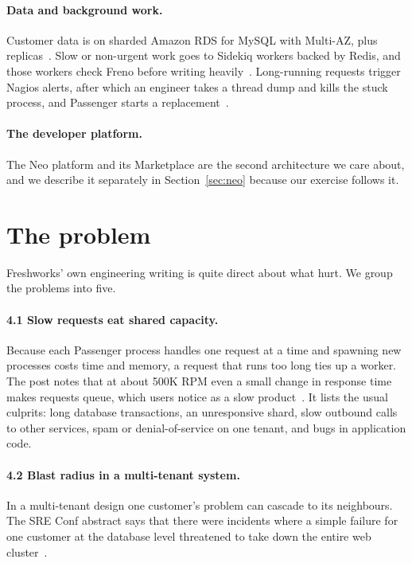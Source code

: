 \documentclass[10pt,a4paper]{article}
\begin{document}
\paragraph{Data and background work.} Customer data is on sharded Amazon RDS for MySQL with Multi-AZ, plus replicas~\cite{kumar2020}. Slow or non-urgent work goes to Sidekiq workers backed by Redis, and those workers check Freno before writing heavily~\cite{bgjobs}. Long-running requests trigger Nagios alerts, after which an engineer takes a thread dump and kills the stuck process, and Passenger starts a replacement~\cite{kumar2020}.

\paragraph{The developer platform.} The Neo platform and its Marketplace are the second architecture we care about, and we describe it separately in Section~\ref{sec:neo} because our exercise follows it.

\section{The problem}

Freshworks' own engineering writing is quite direct about what hurt. We group the problems into five.

\paragraph{4.1 Slow requests eat shared capacity.} Because each Passenger process handles one request at a time and spawning new processes costs time and memory, a request that runs too long ties up a worker. The post notes that at about 500K RPM even a small change in response time makes requests queue, which users notice as a slow product~\cite{kumar2020}. It lists the usual culprits: long database transactions, an unresponsive shard, slow outbound calls to other services, spam or denial-of-service on one tenant, and bugs in application code.

\paragraph{4.2 Blast radius in a multi-tenant system.} In a multi-tenant design one customer's problem can cascade to its neighbours. The SRE Conf abstract says that there were incidents where a simple failure for one customer at the database level threatened to take down the entire web cluster~\cite{srinivasan2023}.
\end{document}
